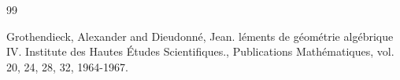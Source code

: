 \documentclass{stacks-project}
\theoremstyle{plain}
\theoremstyle{definition}
\theoremstyle{remark}
\numberwithin{equation}{subsection}
\begin{document}
\begin{thebibliography}{99}

Grothendieck, Alexander and Dieudonn{\'e}, Jean.
l{\'e}ments de g{\'e}om{\'e}trie alg{\'e}brique {IV}.
\newblock Institute des {H}autes {\'E}tudes {S}cientifiques.,
Publications {M}ath{\'e}matiques, vol. 20, 24, 28, 32, 1964-1967.

\end{thebibliography}
\end{document}
